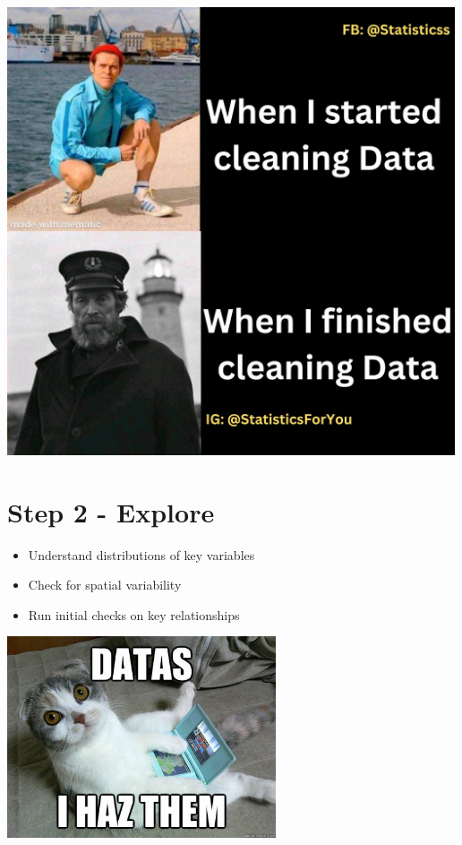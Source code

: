 \documentclass[
  letterpaper,
  DIV=11,
  numbers=noendperiod]{scrreprt}
\providecommand{\tightlist}{%
  \setlength{\itemsep}{0pt}\setlength{\parskip}{0pt}}\usepackage{longtable,booktabs,array}
\begin{document}
\includegraphics[width=5.20833in,height=\textheight]{training-materials/presentation/meme1.jpeg}

\hypertarget{step-2---explore}{%
\section{Step 2 - Explore}\label{step-2---explore}}

\begin{itemize}
\tightlist
\item
  Understand distributions of key variables
\item
  Check for spatial variability
\item
  Run initial checks on key relationships
\end{itemize}

\includegraphics[width=3.125in,height=\textheight]{training-materials/presentation/explore.jpeg}
\end{document}
